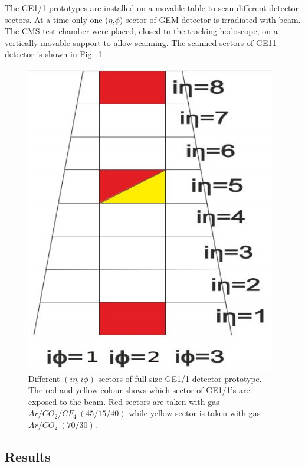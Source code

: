 The GE1/1 prototypes are installed on a movable table to scan different detector sectors. At a time only one ($\eta$,$\phi$) sector of GEM detector is irradiated with beam.
The CMS test chamber were placed, closed to the tracking hodoscope, on a vertically movable support to allow scanning.  The scanned sectors of GE11 detector is shown in Fig.~\ref{GE11}
\begin{figure}[!htbp]
\centering
\includegraphics[scale=0.5,angle=90]{figures/GEM/GE11.png}
\caption{Different $(i\eta,i\phi)$ sectors of full size GE1/1 detector prototype. The red and yellow colour shows which sector of GE1/1's are exposed to the beam. Red sectors are taken with gas $Ar/CO_2/CF_4~(45/15/40)$ while yellow sector is taken with gas $Ar/CO_2~(70/30)$.}
\label{GE11}
\end{figure}
\subsection{Results} %
\label{sub:results}

